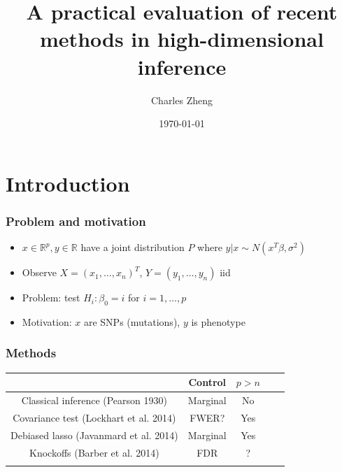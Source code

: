 \documentclass{beamer}
\title{A practical evaluation of recent methods in high-dimensional inference}
\author{Charles Zheng} %
\institute[Stanford] %
{Stanford University}
\date{\today} %
\begin{document}
\begin{frame}
\titlepage %
\end{frame}

\section{Introduction}

\begin{frame}
\frametitle{Problem and motivation}
\begin{itemize}
\item $x \in \mathbb{R}^p, y \in \mathbb{R}$ have a joint distribution $P$ where $y|x \sim N(x^T \beta, \sigma^2)$
\item Observe $X = (x_1, \hdots, x_n)^T$, $Y = (y_1,\hdots, y_n)$ iid
\item Problem: test $H_i: \beta_0 = i$ for $i = 1,\hdots, p$
\item Motivation: $x$ are SNPs (mutations), $y$ is phenotype
\end{itemize}
\end{frame}

\begin{frame}
\frametitle{Methods}
\begin{center}
\begin{tabular}{c|c|c|c|c}
 & Control & $p > n$\\ \hline
Classical inference (Pearson 1930) & Marginal & No \\ \hline
Covariance test (Lockhart et al. 2014) &  FWER? & Yes \\ \hline
Debiased lasso (Javanmard et al. 2014) & Marginal & Yes\\ \hline
Knockoffs (Barber et al. 2014) & FDR & ? \\ \hline
 & & & \\ \hline
\end{tabular}
\end{center}
\end{frame}
\end{document}
